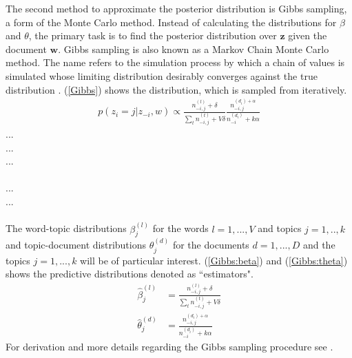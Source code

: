 \documentclass[11pt,a4paper]{article}
\begin{document}
The second method to approximate the posterior distribution is Gibbs sampling, a form of the Monte Carlo method. Instead of calculating the distributions for $\beta$ and $\theta$, the primary task is to find the posterior distribution over $\textbf{z}$ given the document $\textbf{w}$. Gibbs sampling is also known as a Markov Chain Monte Carlo method. The name refers to the simulation process by which a chain of values is simulated whose limiting distribution desirably converges against the true distribution \cite{Griffiths2006}. (\ref{Gibbs}) shows the distribution, which is sampled from iteratively.
\begin{align}\label{Gibbs}
p(z_i=j|z_{-i},w)\propto \frac{n_{-i,j}^{(l)}+\delta}{\sum_t n_{-i,j}^{(t)}+V\delta}
\frac{n_{-i,j}^{(d_i)+\alpha}}{n_{-i}^{(d_i)}+k\alpha}
\end{align}
 		... \\
   		... \\
	... \\
\makebox[1cm][l]{}						\\
				... \\
\makebox[1cm][l]{$\delta,\alpha$} 	... \\
\\
The word-topic distributions $\beta_{j}^{(l)}$ for the words $l=1,...,V$ and topics $j=1,..,k$ and topic-document distributions $\theta_j^{(d)}$ for the documents $d=1,...,D$ and the topics $j=1,...,k$ will be of particular interest. (\ref{Gibbs:beta}) and (\ref{Gibbs:theta}) shows the predictive distributions denoted as ``estimators". 
\begin{align}
\hat\beta_{j}^{(l)}&=\frac{n_{-i,j}^{(l)}+\delta}{\sum_t n_{-i,j}^{(t)}+V\delta} \label{Gibbs:beta} \\
\hat\theta_j^{(d)}&= \frac{n_{-i,j}^{(d_i)+\alpha}}{n_{-i}^{(d_i)}+k\alpha} \label{Gibbs:theta}
\end{align}
For derivation and more details regarding the Gibbs sampling procedure see \cite{Griffiths2006}.
\end{document}
